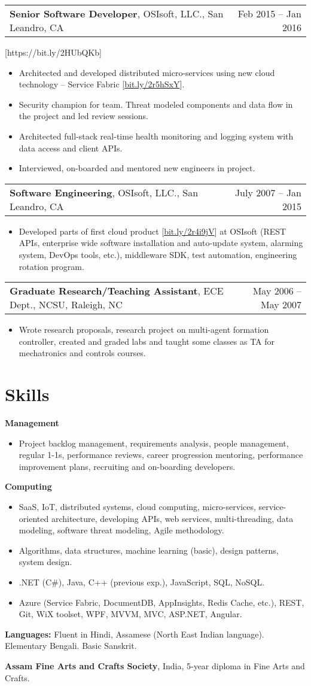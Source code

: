\documentclass[letterpaper,10pt]{article}
\makeatletter
\newcommand{\experienceItem}[3]{
	\begin{tabular*}{\textwidth}{c@{\extracolsep{\fill}}c}
		\multicolumn{1}{l}{\textbf{#1}, #2} & \multicolumn{1}{r}{#3}\\
	\end{tabular*}\vspace{-10pt}
}
\newcommand{\resumeItemListStart}{\begin{itemize}}
\newcommand{\resumeItemListEnd}{\end{itemize}}
\newcommand{\resumeListItem}[1]{
	\item{#1 \vspace{-6pt}}
}
\makeatother
\begin{document}
	\experienceItem{Senior Software Developer}{OSIsoft, LLC., San Leandro, CA}{Feb 2015 -- Jan 2016}
	
	[https://bit.ly/2HUbQKb]
	
	\resumeItemListStart
	\resumeListItem {Architected and developed distributed micro-services using new cloud technology -- Service Fabric [\href{https://bit.ly/2r5hSxY}{bit.ly/2r5hSxY}].}
	\resumeListItem {Security champion for team. Threat modeled components and data flow in the project and led review sessions.}
	\resumeListItem {Architected full-stack real-time health monitoring and logging system with data access and client APIs.}
	\resumeListItem {Interviewed, on-boarded and mentored new engineers in project.}
	\resumeItemListEnd

	\experienceItem{Software Engineering}{OSIsoft, LLC., San Leandro, CA}{July 2007 -- Jan 2015}
	\vspace{-8pt}
	\resumeItemListStart
	\resumeListItem {Developed parts of first cloud product [\href{https://bit.ly/2r4i9jV}{bit.ly/2r4i9jV}] at OSIsoft (REST APIs, enterprise wide software installation and auto-update system, alarming system, DevOps tools, etc.), middleware SDK, test automation, engineering rotation program.}
	\resumeItemListEnd
	
	\experienceItem{Graduate Research/Teaching Assistant}{ECE Dept., NCSU, Raleigh, NC}{May 2006 -- May 2007}
	\vspace{-8pt}
	\resumeItemListStart
	\resumeListItem {Wrote research proposals, research project on multi-agent formation controller, created and graded labs and taught some classes as TA for mechatronics and controls courses.}
	\resumeItemListEnd

	\section{Skills}

	\textbf{Management}\vspace{-8pt}
	\resumeItemListStart
	\resumeListItem{Project backlog management, requirements analysis, people management, regular 1-1s, performance reviews, career progression mentoring, performance improvement plans, recruiting and on-boarding developers.}
	\resumeItemListEnd

	\textbf{Computing}\vspace{-8pt}
	\resumeItemListStart
	\resumeListItem {SaaS, IoT, distributed systems, cloud computing, micro-services, service-oriented architecture, developing APIs, web services, multi-threading, data modeling, software threat modeling, Agile methodology.}
	\resumeListItem {Algorithms, data structures, machine learning (basic), design patterns, system design.}
	\resumeListItem {.NET (C\#), Java, C++ (previous exp.), JavaScript, SQL, NoSQL.}
	\resumeListItem {Azure (Service Fabric, DocumentDB, AppInsights, Redis Cache, etc.), REST, Git, WiX toolset, WPF, MVVM, MVC, ASP.NET, Angular.}
	\resumeItemListEnd

	\textbf{Languages:} Fluent in Hindi, Assamese (North East Indian language). Elementary Bengali. Basic Sanskrit.

	\textbf{Assam Fine Arts and Crafts Society}, India, 5-year diploma in Fine Arts and Crafts.

\end{document}
